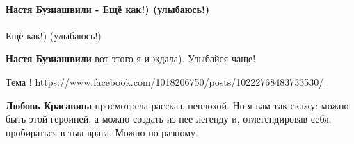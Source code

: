  
 
 
 
 
\paragraph{Настя Бузиашвили - Ещё как!) (улыбаюсь!)}

\begin{itemize}
 
Ещё как!) (улыбаюсь!)

\begin{itemize}
 
\textbf{Настя Бузиашвили} вот этого я и ждала). Улыбайся чаще!
\end{itemize}

 
Тема !
\url{https://www.facebook.com/1018206750/posts/10222768483733530/}

\begin{itemize}
 
\textbf{Любовь Красавина} просмотрела рассказ, неплохой. Но я вам так скажу: можно быть этой героиней, а можно создать из нее легенду и, отлегендировав себя, пробираться в тыл врага. Можно по-разному.


\end{itemize}
\end{itemize}

